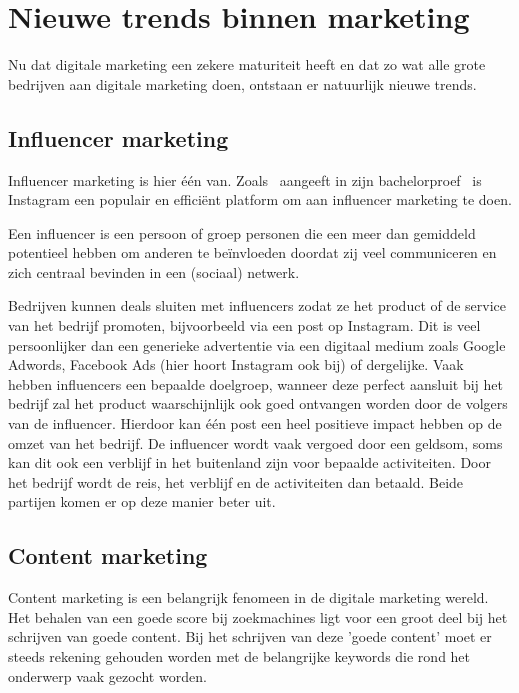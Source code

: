 \section{Nieuwe trends binnen marketing}
\label{sec:nieuwe-trends-marketing}
Nu dat digitale marketing een zekere maturiteit heeft en dat zo wat alle grote bedrijven aan digitale marketing doen, ontstaan er natuurlijk nieuwe trends. 

\subsection{Influencer marketing}
\label{sec:influencer-marketing}
Influencer marketing is hier één van. Zoals~\textcite{Pieters2018} aangeeft in zijn bachelorproef~ is Instagram een populair en efficiënt platform om aan influencer marketing te doen. 

Een influencer is een persoon of groep personen die een meer dan gemiddeld potentieel hebben om anderen te beïnvloeden doordat zij veel communiceren en zich centraal bevinden in een (sociaal) netwerk.~\autocite{Pieters2018}

Bedrijven kunnen deals sluiten met influencers zodat ze het product of de service van het bedrijf promoten, bijvoorbeeld via een post op Instagram. Dit is veel persoonlijker dan een generieke advertentie via een digitaal medium zoals Google Adwords, Facebook Ads (hier hoort Instagram ook bij) of dergelijke. Vaak hebben influencers een bepaalde doelgroep, wanneer deze perfect aansluit bij het bedrijf zal het product waarschijnlijk ook goed ontvangen worden door de volgers van de influencer. Hierdoor kan één post een heel positieve impact hebben op de omzet van het bedrijf. De influencer wordt vaak vergoed door een geldsom, soms kan dit ook een verblijf in het buitenland zijn voor bepaalde activiteiten. Door het bedrijf wordt de reis, het verblijf en de activiteiten dan betaald. Beide partijen komen er op deze manier beter uit.


\subsection{Content marketing}
\label{sec:content-marketing}
Content marketing is een belangrijk fenomeen in de digitale marketing wereld. Het behalen van een goede score bij zoekmachines ligt voor een groot deel bij het schrijven van goede content. Bij het schrijven van deze 'goede content' moet er steeds rekening gehouden worden met de belangrijke keywords die rond het onderwerp vaak gezocht worden. 

